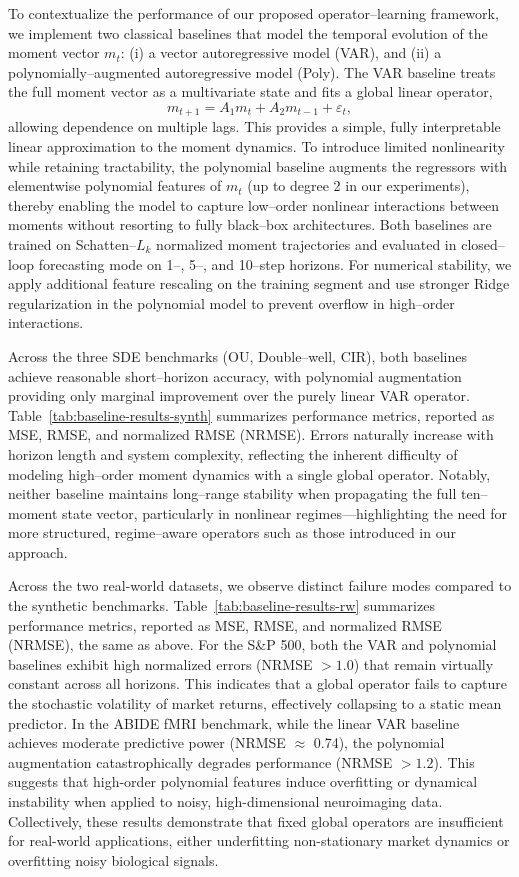\documentclass[journal, onecolumn]{IEEEtran}
\begin{document}
To contextualize the performance of our proposed operator--learning framework, we implement two classical baselines that model the temporal evolution of the moment vector $m_t$: (i) a vector autoregressive model (VAR), and (ii) a polynomially--augmented autoregressive model (Poly). The VAR baseline treats the full moment vector as a multivariate state and fits a global linear operator,
\[
m_{t+1} = A_1 m_t + A_2 m_{t-1} + \varepsilon_t,
\]
allowing dependence on multiple lags. This provides a simple, fully interpretable linear approximation to the moment dynamics. To introduce limited nonlinearity while retaining tractability, the polynomial baseline augments the regressors with elementwise polynomial features of $m_t$ (up to degree 2 in our experiments), thereby enabling the model to capture low--order nonlinear interactions between moments without resorting to fully black--box architectures. Both baselines are trained on Schatten--$L_k$ normalized moment trajectories and evaluated in closed--loop forecasting mode on 1--, 5--, and 10--step horizons. For numerical stability, we apply additional feature rescaling on the training segment and use stronger Ridge regularization in the polynomial model to prevent overflow in high--order interactions.

Across the three SDE benchmarks (OU, Double--well, CIR), both baselines achieve reasonable short--horizon accuracy, with polynomial augmentation providing only marginal improvement over the purely linear VAR operator. Table~\ref{tab:baseline-results-synth} summarizes performance metrics, reported as MSE, RMSE, and normalized RMSE (NRMSE). Errors naturally increase with horizon length and system complexity, reflecting the inherent difficulty of modeling high--order moment dynamics with a single global operator. Notably, neither baseline maintains long--range stability when propagating the full ten--moment state vector, particularly in nonlinear regimes---highlighting the need for more structured, regime--aware operators such as those introduced in our approach.

Across the two real-world datasets, we observe distinct failure modes compared to the synthetic benchmarks. Table~\ref{tab:baseline-results-rw} summarizes performance metrics, reported as MSE, RMSE, and normalized RMSE (NRMSE), the same as above. For the S\&P 500, both the VAR and polynomial baselines exhibit high normalized errors (NRMSE $> 1.0$) that remain virtually constant across all horizons. This indicates that a global operator fails to capture the stochastic volatility of market returns, effectively collapsing to a static mean predictor. In the ABIDE fMRI benchmark, while the linear VAR baseline achieves moderate predictive power (NRMSE $\approx$ 0.74), the polynomial augmentation catastrophically degrades performance (NRMSE $> 1.2$). This suggests that high-order polynomial features induce overfitting or dynamical instability when applied to noisy, high-dimensional neuroimaging data. Collectively, these results demonstrate that fixed global operators are insufficient for real-world applications, either underfitting non-stationary market dynamics or overfitting noisy biological signals.
\end{document}
